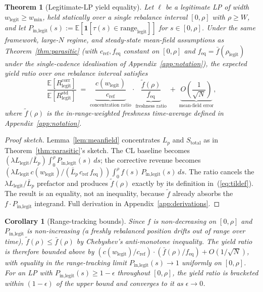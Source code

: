 \documentclass[11pt,a4paper]{article}
\theoremstyle{definition}
\theoremstyle{plain}
\newtheorem{theorem}{Theorem}
\newtheorem{corollary}{Corollary}
\theoremstyle{remark}
\begin{document}
\begin{theorem}[Legitimate-LP yield equality]\label{thm:legit}
Let $\ell$ be a legitimate LP of width $w_{\text{legit}} \geq w_{\min}$, held statically over a single rebalance interval $[0, \rho]$ with $\rho \geq W$, and let $P_{\text{in,legit}}(s) := \mathbb{E}[\mathbf{1}[\tau(s) \in \text{range}_{\text{legit}}]]$ for $s \in [0, \rho]$. Under the same framework, large-$N$ regime, and steady-state mean-field assumptions as Theorem~\ref{thm:parasitic} (with $c_{\text{ref}}, f_{\text{eq}}$ constant on $[0, \rho]$ and $f_{\text{eq}} = \bar f(\rho_{\text{legit}})$ under the single-cadence idealisation of Appendix~\ref{app:notation}), the expected yield ratio over one rebalance interval satisfies
\begin{equation}\label{eq:thm2}
\frac{\mathbb{E}[R^{\text{corr}}_{\text{legit}}]}{\mathbb{E}[R^{\text{std}}_{\text{legit}}]} \;=\; \underbrace{\frac{c(w_{\text{legit}})}{c_{\text{ref}}}}_{\text{concentration ratio}} \cdot \underbrace{\frac{\tilde f(\rho)}{f_{\text{eq}}}}_{\text{freshness ratio}} \;+\; \underbrace{O\!\left(\frac{1}{\sqrt N}\right)}_{\text{mean-field error}},
\end{equation}
where $\tilde f(\rho)$ is the in-range-weighted freshness time-average defined in Appendix~\ref{app:notation}.
\end{theorem}

\begin{proof}[Proof sketch]
Lemma~\ref{lem:meanfield} concentrates $L_p$ and $S_{\text{total}}$ as in Theorem~\ref{thm:parasitic}'s sketch. The CL baseline becomes $(\lambda L_{\text{legit}}/\bar L_p) \int_0^\rho P_{\text{in,legit}}(s)\,ds$; the corrective revenue becomes $(\lambda L_{\text{legit}}\,c(w_{\text{legit}})/(\bar L_p\,c_{\text{ref}}\,f_{\text{eq}})) \int_0^\rho f(s)\,P_{\text{in,legit}}(s)\,ds$. The ratio cancels the $\lambda L_{\text{legit}}/\bar L_p$ prefactor and produces $\tilde f(\rho)$ exactly by its definition in~(\ref{eq:tildef}). The result is an equality, not an inequality, because $\tilde f$ already absorbs the $f \cdot P_{\text{in,legit}}$ integrand. Full derivation in Appendix~\ref{app:derivations}.
\end{proof}

\begin{corollary}[Range-tracking bounds]\label{cor:rangetracking}
Since $f$ is non-decreasing on $[0, \rho]$ and $P_{\text{in,legit}}$ is non-increasing (a freshly rebalanced position drifts out of range over time), $\tilde f(\rho) \leq \bar f(\rho)$ by Chebyshev's anti-monotone inequality. The yield ratio is therefore bounded above by $(c(w_{\text{legit}})/c_{\text{ref}}) \cdot (\bar f(\rho)/f_{\text{eq}}) + O(1/\sqrt N)$, with equality in the range-tracking limit $P_{\text{in,legit}}(s) \to 1$ uniformly on $[0, \rho]$. For an LP with $P_{\text{in,legit}}(s) \geq 1 - \epsilon$ throughout $[0, \rho]$, the yield ratio is bracketed within $(1 - \epsilon)$ of the upper bound and converges to it as $\epsilon \to 0$.
\end{corollary}
\end{document}
